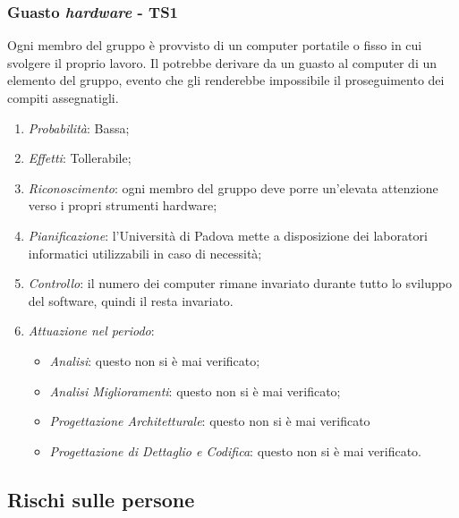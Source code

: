 \subsubsection{Guasto \textit{hardware} - TS1}
Ogni membro del gruppo \`e provvisto di un computer portatile o fisso in cui svolgere il proprio lavoro. Il  potrebbe derivare da un guasto al computer di un elemento del gruppo, evento che gli renderebbe impossibile il proseguimento dei compiti assegnatigli.
\begin{enumerate}
\item \textit{Probabilit\`a}: Bassa;
\item \textit{Effetti}: Tollerabile; 
\item \textit{Riconoscimento}: ogni membro del gruppo deve porre un’elevata attenzione verso i propri strumenti hardware;
\item \textit{Pianificazione}: l'Universit\`a di Padova mette a disposizione dei laboratori informatici utilizzabili
in caso di necessit\`a;
\item \textit{Controllo}: il numero dei computer rimane invariato durante tutto lo sviluppo del software, quindi il  resta invariato.
\item \textit{Attuazione nel periodo}: 
	\begin{itemize}
	\item \textit{Analisi}: questo  non si è mai verificato;
	\item \textit{Analisi Miglioramenti}: questo  non si è mai verificato;
	\item \textit{Progettazione Architetturale}: questo  non si è mai verificato
	\item \textit{Progettazione di Dettaglio e Codifica}: questo  non si è mai verificato.
	\end{itemize}
\end{enumerate}

\subsection{Rischi sulle persone}
